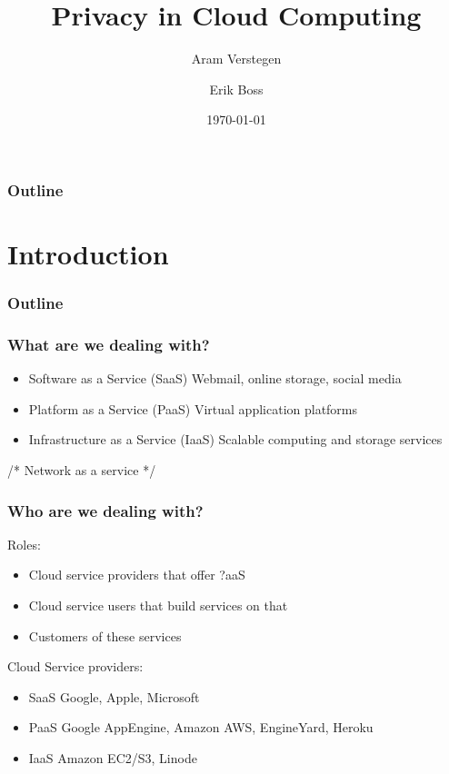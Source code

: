 \documentclass{beamer}
\title{Privacy in Cloud Computing}
\author{Aram Verstegen \and Erik Boss}
\institute{Radboud University Nijmegen}
\date{\today}
\begin{document}
\begin{frame}
  \titlepage
\end{frame}

\begin{frame}
  \frametitle{Outline}
  \tableofcontents
\end{frame}


\section{Introduction}

\begin{frame}
  \frametitle{Outline}
\end{frame}

\begin{frame}
    \frametitle{What are we dealing with?}
    \begin{itemize}	
    \item \small Software as a Service (SaaS)
      \scriptsize{Webmail, online storage, social media}
    \item \small Platform as a Service (PaaS)
      \scriptsize{Virtual application platforms}
    \item \small Infrastructure as a Service (IaaS)
      \scriptsize{Scalable computing and storage services}
    \end{itemize}
    /* Network as a service */
\end{frame}

\begin{frame}
    \frametitle{Who are we dealing with?}
    Roles:
    \begin{itemize} %
      \item Cloud service providers that offer ?aaS
      \item Cloud service users that build services on that
      \item Customers of these services
    \end{itemize}

    Cloud Service providers:
    \begin{itemize}	
    \item \small SaaS
      \scriptsize{Google, Apple, Microsoft}
    \item \small PaaS
      \scriptsize{Google AppEngine, Amazon AWS, EngineYard, Heroku}
    \item \small IaaS
      \scriptsize{Amazon EC2/S3, Linode}
    \end{itemize}

\end{frame}
\end{document}
